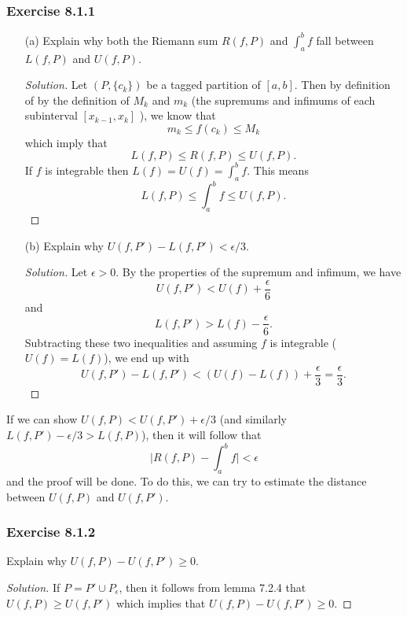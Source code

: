 
\subsubsection{Exercise 8.1.1} 
\begin{enumerate}
    \item[(a)] Explain why both the Riemann sum \( R(f,P)  \) and \( \int_{ a }^{ b } f  \) fall between \( L(f,P)  \) and \( U(f,P)  \). 
        \begin{proof}[Solution]
            Let \( (P, \{ c_{k }  \} ) \) be a tagged partition of \( [a,b]  \). Then by definition of by the definition of \( M_{k }  \)  and \( m_{k }   \) (the supremums and infimums  of each subinterval \( [x_{k-1} , x_{k }] \) ), we know that 
            \[  m_{ k } \leq f(c_{ k }  )  \leq M_{k } \] which imply that 
            \[ L(f,P) \leq R(f,P) \leq U(f,P). \]
            If \( f  \) is integrable then \( L(f) = U(f) = \int_{ a }^{ b } f   \). This means 
            \[ L(f,P) \leq \int_{ a }^{ b } f \leq U(f,P).\]
        \end{proof}
        \item[(b)] Explain why \( U(f,P') - L(f, P') < \epsilon / 3.  \)
            \begin{proof}[Solution]
           Let \( \epsilon > 0  \). By the properties of the supremum and infimum, we have 
            \[ U(f,P') < U(f) + \frac{ \epsilon  }{ 6 } \] and 
            \[  L(f,P') > L(f) - \frac{ \epsilon  }{ 6 }. \] Subtracting these two inequalities and assuming \( f  \) is integrable (\( U(f) = L(f) \)), we end up with 
            \[  U(f,P') - L(f,P') < (U(f) - L(f)) + \frac{ \epsilon  }{ 3 } = \frac{ \epsilon  }{ 3 }. \]
            \end{proof}
\end{enumerate}

If we can show \( U(f,P) < U(f,P') + \epsilon / 3   \) (and similarly \( L(f,P') - \epsilon / 3 > L(f,P)  \)), then it will follow that 
\[  \Big| R(f,P) - \int_{ a }^{ b } f  \Big| < \epsilon \]
and the proof will be done. To do this, we can try to estimate the distance between \( U(f,P)  \) and \( U(f, P')  \).
\subsubsection{Exercise 8.1.2} Explain why \( U(f,P) - U(f,P') \geq 0  \).
\begin{proof}[Solution]
If \( P = P' \cup P_{\epsilon }  \), then it follows from lemma 7.2.4 that \( U(f,P) \geq U(f,P')   \) which implies that \( U(f,P) - U(f,P') \geq 0  \). 
\end{proof}


